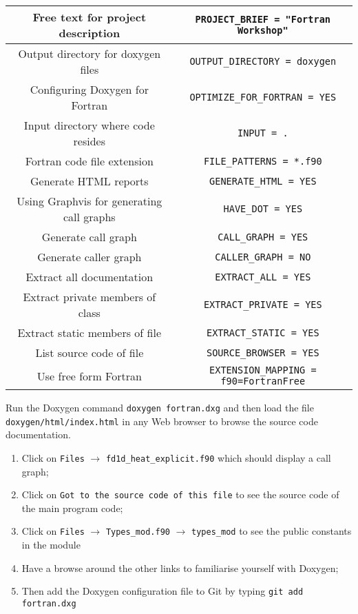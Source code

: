 \documentclass[12pt]{article}
\begin{document}
\begin{enumerate}
\begin{center}
\begin{tabular}{| c | c |}
Free text for project description & \texttt{PROJECT\_BRIEF = "Fortran Workshop"} \\ \hline
Output directory for doxygen files & \texttt{OUTPUT\_DIRECTORY = doxygen} \\ \hline
Configuring Doxygen for Fortran & \texttt{OPTIMIZE\_FOR\_FORTRAN = YES} \\ \hline
Input directory where code resides & \texttt{INPUT = .} \\ \hline
Fortran code file extension & \texttt{FILE\_PATTERNS = *.f90} \\ \hline
Generate HTML reports & \texttt{GENERATE\_HTML = YES} \\ \hline
Using Graphvis for generating call graphs & \texttt{HAVE\_DOT = YES} \\ \hline
Generate call graph & \texttt{CALL\_GRAPH = YES} \\ \hline
Generate caller graph & \texttt{CALLER\_GRAPH = NO} \\ \hline
Extract all documentation & \texttt{EXTRACT\_ALL = YES} \\ \hline
Extract private members of class & \texttt{EXTRACT\_PRIVATE = YES} \\ \hline
Extract static members of file & \texttt{EXTRACT\_STATIC = YES} \\ \hline
List source code of file & \texttt{SOURCE\_BROWSER = YES} \\ \hline
Use free form Fortran & \texttt{EXTENSION\_MAPPING = f90=FortranFree} \\ \hline
\end{tabular}
\end{center}
Run the Doxygen command \texttt{doxygen fortran.dxg} and then load the file \newline
\texttt{doxygen/html/index.html} in any Web browser to browse the source code documentation.
\begin{enumerate}
\item Click on \texttt{Files} $\rightarrow$ \texttt{fd1d\_heat\_explicit.f90} which should display a call graph;
\item Click on \texttt{Got to the source code of this file} to see the source code of the main program code;
\item Click on \texttt{Files} $\rightarrow$ \texttt{Types\_mod.f90} $\rightarrow$ \texttt{types\_mod} to see
the public constants in the module
\item Have a browse around the other links to familiarise yourself with Doxygen;
\item Then add the Doxygen configuration file to Git by typing \texttt{git add fortran.dxg}

\end{enumerate}
\end{enumerate}
\end{document}
